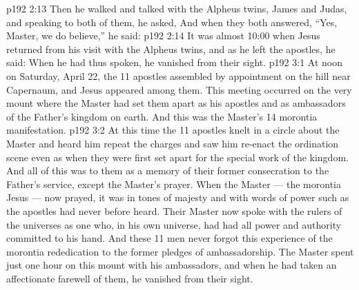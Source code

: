 \vs p192 2:13 \pc Then he walked and talked with the Alpheus twins, James and Judas, and speaking to both of them, he asked,  And when they both answered, “Yes, Master, we do believe,” he said: 
\vs p192 2:14 \pc It was almost 10:00 when Jesus returned from his visit with the Alpheus twins, and as he left the apostles, he said:  When he had thus spoken, he vanished from their sight.
\vs p192 3:1 At noon on Saturday, April 22, the 11 apostles assembled by appointment on the hill near Capernaum, and Jesus appeared among them. This meeting occurred on the very mount where the Master had set them apart as his apostles and as ambassadors of the Father’s kingdom on earth. And this was the Master’s 14 morontia manifestation.
\vs p192 3:2 At this time the 11 apostles knelt in a circle about the Master and heard him repeat the charges and saw him re\hyp{}enact the ordination scene even as when they were first set apart for the special work of the kingdom. And all of this was to them as a memory of their former consecration to the Father’s service, except the Master’s prayer. When the Master --- the morontia Jesus --- now prayed, it was in tones of majesty and with words of power such as the apostles had never before heard. Their Master now spoke with the rulers of the universes as one who, in his own universe, had had all power and authority committed to his hand. And these 11 men never forgot this experience of the morontia rededication to the former pledges of ambassadorship. The Master spent just one hour on this mount with his ambassadors, and when he had taken an affectionate farewell of them, he vanished from their sight.
